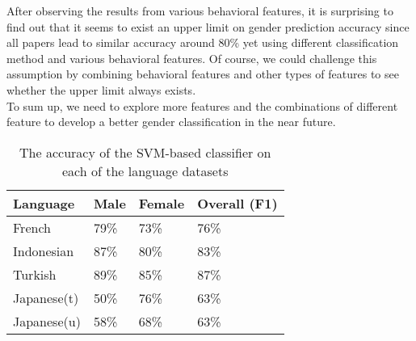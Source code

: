 \documentclass[runningheads]{llncs}
\begin{document}
	After observing the results from various behavioral features, it is surprising to find out that it seems to exist an upper limit on gender prediction accuracy since all papers lead to similar accuracy around 80\% yet using different classification method and various behavioral features. Of course, we could challenge this assumption by combining behavioral features and other types of features to see whether the upper limit always exists. \\
	
	To sum up, we need to explore more features and the combinations of different feature to develop a better gender classification in the near future. 
	
	\begin{table}
		\centering
		\caption{The accuracy of the SVM-based classifier on each of the language datasets }
		\begin{tabular}{| x{2cm} | x{2cm} | x{2cm} | x{2cm} |}
			\hline
			Language  &  Male  & Female & Overall (F1)\\
			\hline
			French & 79\% & 73\% & 76\% \\
			Indonesian & 87\% & 80\% & 83\% \\
			Turkish & 89\% & 85\% & 87\% \\
			Japanese(t) & 50\% & 76\% & 63\% \\
			Japanese(u) & 58\% & 68\% & 63\% \\
			\hline
		\end{tabular}
		\label{table:language}
	\end{table}
	
	
	
	\newpage
	
	
	
	
\end{document}
